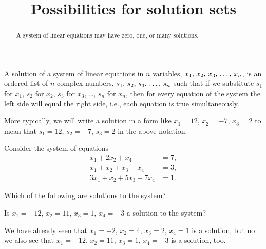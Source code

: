 \documentclass{ximera}
\title{Possibilities for solution sets}
\begin{document}
\begin{abstract}
  A system of linear equations may have zero, one, or many solutions.
\end{abstract}
\maketitle

\begin{definition}
A solution of a system of linear equations in $n$ variables, ${x}_{1},\,{x}_{2},\,{x}_{3},\,\ldots,\,{x}_{n}$, is an ordered list of $n$ complex numbers, ${s}_{1},\,{s}_{2},\,{s}_{3},\,\ldots,\,{s}_{n}$ such that if we substitute $s_1$ for $x_1$, $s_2$ for $x_2$, $s_3$ for $x_3$, \ldots, $s_n$ for $x_n$,  then for every equation of the system the left side will equal the right side, i.e., each equation is true simultaneously.
\end{definition}

More typically, we will write a solution in a form like $x_1=12$, $x_2=-7$, $x_3=2$ to mean that $s_1=12$, $s_2=-7$, $s_3=2$ in the above notation.

\begin{exercise}
  Consider the system of equations
  \begin{align*}
    x_1+2x_2 + x_4&= 7,\\
    x_1+x_2+x_3-x_4&=3,\\
    3x_1+x_2+5x_3-7x_4&=1.
  \end{align*}
  
  \begin{question}
    Which of the following are solutions to the system?
    \begin{multipleChoice}
    \end{multipleChoice}
  
    \begin{question}
      Is $x_{1}=-12$, $x_{2}=11$, $x_{3}=1$, $x_{4}=-3$ a solution to the system?
      \begin{multipleChoice}
      \end{multipleChoice}
      
      \begin{feedback}
        We have already seen that $x_{1}=-2$, $x_{2}=4$, $x_{3}=2$,
        $x_{4}=1$ is a solution, but no we also see that $x_{1}=-12$,
        $x_{2}=11$, $x_{3}=1$, $x_{4}=-3$ is a solution, too.
      \end{feedback}
    \end{question}

  \end{question}
  
\end{exercise}
\end{document}
